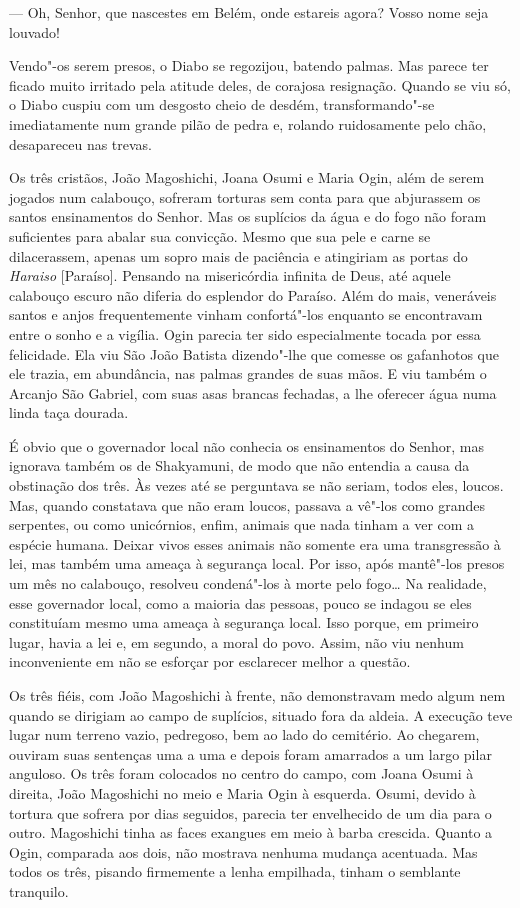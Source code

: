 --- Oh, Senhor, que nascestes em Belém, onde estareis agora? Vosso nome
seja louvado!

Vendo"-os serem presos, o Diabo se regozijou, batendo palmas. Mas parece
ter ficado muito irritado pela atitude deles, de corajosa resignação.
Quando se viu só, o Diabo cuspiu com um desgosto cheio de desdém,
transformando"-se imediatamente num grande pilão de pedra e, rolando
ruidosamente pelo chão, desapareceu nas trevas.

Os três cristãos, João Magoshichi, Joana Osumi e Maria Ogin, além de
serem jogados num calabouço, sofreram torturas sem conta para que
abjurassem os santos ensinamentos do Senhor. Mas os suplícios da água e
do fogo não foram suficientes para abalar sua convicção. Mesmo que sua
pele e carne se dilacerassem, apenas um sopro mais de paciência e
atingiriam as portas do \textit{Haraiso} [Paraíso]. Pensando na
misericórdia infinita de Deus, até aquele calabouço escuro não diferia
do esplendor do Paraíso. Além do mais, veneráveis santos e anjos
frequentemente vinham confortá"-los enquanto se encontravam entre o
sonho e a vigília. Ogin parecia ter sido especialmente tocada por essa
felicidade. Ela viu São João Batista dizendo"-lhe que comesse os
gafanhotos que ele trazia, em abundância, nas palmas grandes de suas
mãos. E viu também o Arcanjo São Gabriel, com suas asas brancas
fechadas, a lhe oferecer água numa linda taça dourada.

É obvio que o governador local não conhecia os ensinamentos do Senhor,
mas ignorava também os de Shakyamuni, de modo que não entendia a causa
da obstinação dos três. Às vezes até se perguntava se não seriam, todos
eles, loucos. Mas, quando constatava que não eram loucos, passava a
vê"-los como grandes serpentes, ou como unicórnios, enfim, animais que
nada tinham a ver com a espécie humana. Deixar vivos esses animais não
somente era uma transgressão à lei, mas também uma ameaça à segurança
local. Por isso, após mantê"-los presos um mês no calabouço, resolveu
condená"-los à morte pelo fogo\ldots{} Na realidade, esse governador local,
como a maioria das pessoas, pouco se indagou se eles constituíam mesmo
uma ameaça à segurança local. Isso porque, em primeiro lugar, havia a
lei e, em segundo, a moral do povo. Assim, não viu nenhum inconveniente
em não se esforçar por esclarecer melhor a questão.

Os três fiéis, com João Magoshichi à frente, não demonstravam medo algum
nem quando se dirigiam ao campo de suplícios, situado fora da aldeia. A
execução teve lugar num terreno vazio, pedregoso, bem ao lado do
cemitério. Ao chegarem, ouviram suas sentenças uma a uma e depois
foram amarrados a um largo pilar anguloso. Os três foram colocados no
centro do campo, com Joana Osumi à direita, João Magoshichi no meio e
Maria Ogin à esquerda. Osumi, devido à tortura que sofrera por dias
seguidos, parecia ter envelhecido de um dia para o outro. Magoshichi
tinha as faces exangues em meio à barba crescida. Quanto a Ogin,
comparada aos dois, não mostrava nenhuma mudança acentuada. Mas todos
os três, pisando firmemente a lenha empilhada, tinham o semblante tranquilo.

